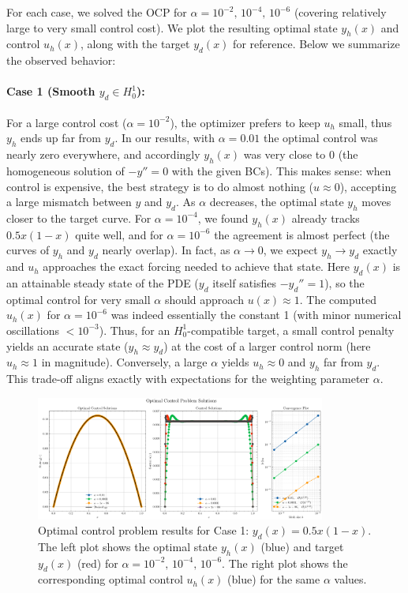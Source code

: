 For each case, we solved the OCP for $\alpha = 10^{-2},\,10^{-4},\,10^{-6}$ (covering relatively large to very small control cost). We plot the resulting optimal state $y_h(x)$ and control $u_h(x)$, along with the target $y_d(x)$ for reference. Below we summarize the observed behavior:

\paragraph{Case 1 (Smooth $y_d \in H^1_0$):}
For a large control cost ($\alpha=10^{-2}$), the optimizer prefers to keep $u_h$ small, thus $y_h$ ends up far from $y_d$. In our results, with $\alpha=0.01$ the optimal control was nearly zero everywhere, and accordingly $y_h(x)$ was very close to 0 (the homogeneous solution of $-y''=0$ with the given BCs).
This makes sense: when control is expensive, the best strategy is to do almost nothing ($u\approx0$), accepting a large mismatch between $y$ and $y_d$.
As $\alpha$ decreases, the optimal state $y_h$ moves closer to the target curve. For $\alpha=10^{-4}$, we found $y_h(x)$ already tracks $0.5x(1-x)$ quite well, and for $\alpha=10^{-6}$ the agreement is almost perfect (the curves of $y_h$ and $y_d$ nearly overlap). In fact, as $\alpha\to 0$, we expect $y_h\to y_d$ exactly and $u_h$ approaches the exact forcing needed to achieve that state. Here $y_d(x)$ is an attainable steady state of the PDE ($y_d$ itself satisfies $-y_d'' = 1$), so the optimal control for very small $\alpha$ should approach $u(x)\approx 1$. The computed $u_h(x)$ for $\alpha=10^{-6}$ was indeed essentially the constant 1 (with minor numerical oscillations $<10^{-3}$). Thus, for an $H^1_0$-compatible target, a small control penalty yields an accurate state ($y_h \approx y_d$) at the cost of a larger control norm (here $u_h\approx 1$ in magnitude). Conversely, a large $\alpha$ yields $u_h\approx 0$ and $y_h$ far from $y_d$. This trade-off aligns exactly with expectations for the weighting parameter $\alpha$.
\begin{figure}[H]
	\centering
	\includegraphics[width=0.85\textwidth]{figures/opt_control_plot_Case 1.png}
	\caption{Optimal control problem results for Case 1: $y_d(x)=0.5x(1-x)$. The left plot shows the optimal state $y_h(x)$ (blue) and target $y_d(x)$ (red) for $\alpha=10^{-2},\,10^{-4},\,10^{-6}$. The right plot shows the corresponding optimal control $u_h(x)$ (blue) for the same $\alpha$ values.}
	\label{fig:opt_control_case1}
\end{figure}

